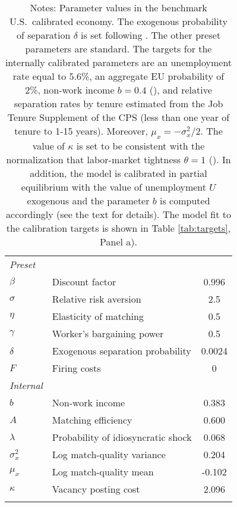 \begin{table}[!h]
	\centering
	\label{tab:param:benchmark}
	\begin{tabular}{l l c}
		\hline \hline
		\addlinespace
		\textit{Preset} & & \\ 
		$\beta$ & Discount factor & 0.996 \\ 
		$\sigma$ & Relative risk aversion & 2.5 \\ 
		$\eta$ & Elasticity of matching & 0.5 \\ 
		$\gamma$ & Worker's bargaining power & 0.5 \\ 
		$\delta$ & Exogenous separation probability & 0.0024 \\ 
		$F$ & Firing costs & 0 \\ 
		\addlinespace
		\textit{Internal} & & \\ 
		$b$ & Non-work income & 0.383 \\ 
		$A$ & Matching efficiency & 0.600 \\ 
		$\lambda$ & Probability of idiosyncratic shock & 0.068 \\ 
		$\sigma_x^2$ & Log match-quality variance & 0.204 \\ 
		$\mu_x$ & Log match-quality mean & -0.102 \\ 
		$\kappa$ & Vacancy posting cost & 2.096 \\ 
		\addlinespace
		\hline \hline
	\end{tabular}
	\caption*{\footnotesize Notes: Parameter values in the benchmark U.S.\ calibrated economy. The exogenous probability of separation $\delta$ is set following \cite{jung_kuhn:JEEA:2019}. The other preset parameters are standard. The targets for the internally calibrated parameters are an unemployment rate equal to 5.6\%, an aggregate EU probability of 2\%, non-work income $b=0.4$ (\cite{shimer:2005:AER}), and relative separation rates by tenure estimated from the Job Tenure Supplement of the CPS (less than one year of tenure to 1-15 years). Moreover, $\mu_x = -\sigma_x^2/2$. The value of $\kappa$ is set to be consistent with the normalization that labor-market tightness $\theta=1$ (\cite{shimer:2005:AER}). In addition, the model is calibrated in partial equilibrium with the value of unemployment $U$ exogenous and the parameter $b$ is computed accordingly (see the text for details). The model fit to the calibration targets is shown in Table \ref{tab:targets}, Panel a).}\end{table}

